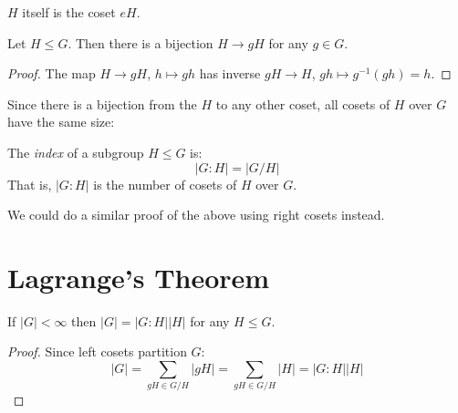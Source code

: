 \documentclass[../main.tex]{subfiles}
\begin{document}
\begin{remark}[Note]
  $H$ itself is the coset $eH$.
\end{remark}
\begin{lemma}
  Let $H \leq G$.
  Then there is a bijection $H \to gH$ for any $g \in G$.
\end{lemma}
\begin{proof}
  The map $H \to gH$, $h \mapsto gh$ has inverse $gH \to H$, $gh \mapsto g^{-1}(gh) = h$.
\end{proof}
Since there is a bijection from the $H$ to any other coset, all cosets of $H$ over $G$ have the same size:
\begin{center}
\end{center}

\begin{definition}[Index]
  The \textit{index} of a subgroup $H \leq G$ is:
  \[
    |G : H| = |G / H|
  \]
  That is, $|G : H|$ is the number of cosets of $H$ over $G$.
\end{definition}
\begin{remark}
  We could do a similar proof of the above using right cosets instead.
\end{remark}

\section{Lagrange's Theorem}
\begin{theorem}
  If $|G| < \infty$ then $|G| = |G : H| |H|$ for any $H \leq G$.
\end{theorem}
\begin{proof}
  Since left cosets partition $G$:
  \[
    |G| = \sum_{gH \in G / H} |gH| = \sum_{gH \in G / H} |H| = |G : H||H|
  \]
\end{proof}
\end{document}
